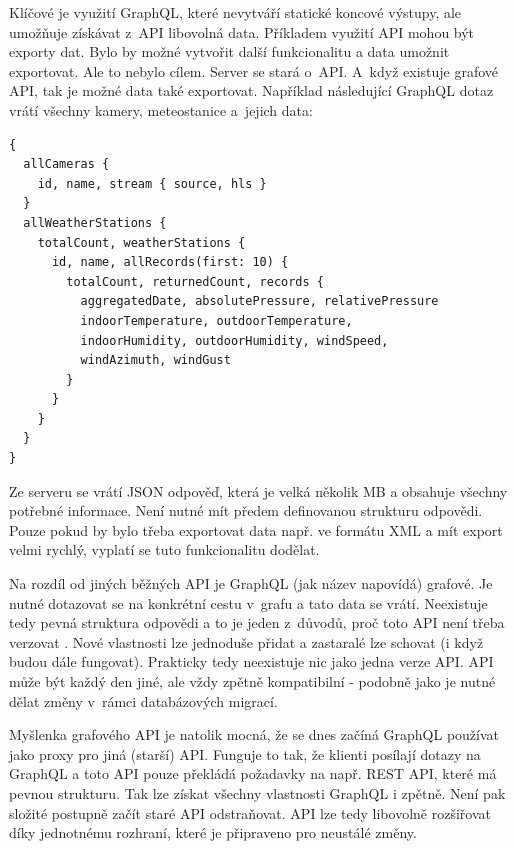 Klíčové je využití GraphQL, které nevytváří statické koncové výstupy, ale umožňuje získávat z~API libovolná data. Příkladem využití API mohou být exporty dat. Bylo by možné vytvořit další funkcionalitu a data umožnit exportovat. Ale to nebylo cílem. Server se stará o~API. A~když existuje grafové API, tak je možné data také exportovat. Například následující GraphQL dotaz vrátí všechny kamery, meteostanice a~jejich data:

\begin{verbatim}
{
  allCameras {
    id, name, stream { source, hls }
  }
  allWeatherStations {
    totalCount, weatherStations {
      id, name, allRecords(first: 10) {
        totalCount, returnedCount, records {
          aggregatedDate, absolutePressure, relativePressure
          indoorTemperature, outdoorTemperature,
          indoorHumidity, outdoorHumidity, windSpeed,
          windAzimuth, windGust
        }
      }
    }
  }
}
\end{verbatim}

Ze serveru se vrátí JSON odpověď, která je velká několik MB a obsahuje všechny potřebné informace. Není nutné mít předem definovanou strukturu odpovědi. Pouze pokud by bylo třeba exportovat data např. ve formátu XML a mít export velmi rychlý, vyplatí se tuto funkcionalitu dodělat.

Na rozdíl od jiných běžných API je GraphQL (jak název napovídá) grafové. Je nutné dotazovat se na konkrétní cestu v~grafu a tato data se vrátí. Neexistuje tedy pevná struktura odpovědi a to je jeden z~důvodů, proč toto API není třeba verzovat \cite{graphql:versioning}. Nové vlastnosti lze jednoduše přidat a zastaralé lze schovat (i když budou dále fungovat). Prakticky tedy neexistuje nic jako jedna verze API. API může být každý den jiné, ale vždy zpětně kompatibilní - podobně jako je nutné dělat změny v~rámci databázových migrací.

Myšlenka grafového API je natolik mocná, že se dnes začíná GraphQL používat jako proxy pro jiná (starší) API. Funguje to tak, že klienti posílají dotazy na GraphQL a toto API pouze překládá požadavky na např. REST API, které má pevnou strukturu. Tak lze získat všechny vlastnosti GraphQL i zpětně. Není pak složité postupně začít staré API odstraňovat. API lze tedy libovolně rozšiřovat díky jednotnému rozhraní, které je připraveno pro neustálé změny.